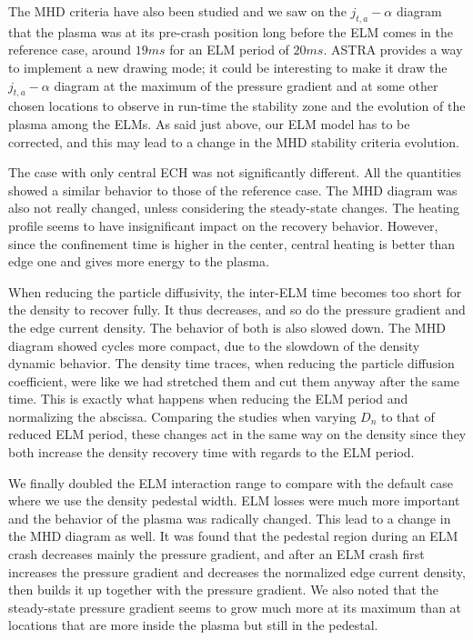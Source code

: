 The MHD criteria have also been studied and we saw on the $j_{t,a} - \alpha$ diagram that the plasma was at its pre-crash position long before the ELM comes in the reference case, around $19ms$ for an ELM period of $20ms$. ASTRA provides a way to implement a new drawing mode; it could be interesting to make it draw the $j_{t,a}-\alpha$ diagram at the maximum of the pressure gradient and at some other chosen locations to observe in run-time the stability zone and the evolution of the plasma among the ELMs. As said just above, our ELM model has to be corrected, and this may lead to a change in the MHD stability criteria evolution.

The case with only central ECH was not significantly different. All the quantities showed a similar behavior to those of the reference case. The MHD diagram was also not really changed, unless considering the steady-state changes. The heating profile seems to have insignificant impact on the recovery behavior. However, since the confinement time is higher in the center, central heating is better than edge one and gives more energy to the plasma.

When reducing the particle diffusivity, the inter-ELM time becomes too short for the density to recover fully. It thus decreases, and so do the pressure gradient and the edge current density. The behavior of both is also slowed down. The MHD diagram showed cycles more compact, due to the slowdown of the density dynamic behavior. The density time traces, when reducing the particle diffusion coefficient, were like we had stretched them and cut them anyway after the same time. This is exactly what happens when reducing the ELM period and normalizing the abscissa. Comparing the studies when varying $D_n$ to that of reduced ELM period, these changes act in the same way on the density since they both increase the density recovery time with regards to the ELM period. 

We finally doubled the ELM interaction range to compare with the default case where we use the density pedestal width. ELM losses were much more important and the behavior of the plasma was radically changed. This lead to a change in the MHD diagram as well. It was found that the pedestal region during an ELM crash decreases mainly the pressure gradient, and after an ELM crash first increases the pressure gradient and decreases the normalized edge current density, then builds it up together with the pressure gradient. We also noted that the steady-state pressure gradient seems to grow much more at its maximum than at locations that are more inside the plasma but still in the pedestal.

